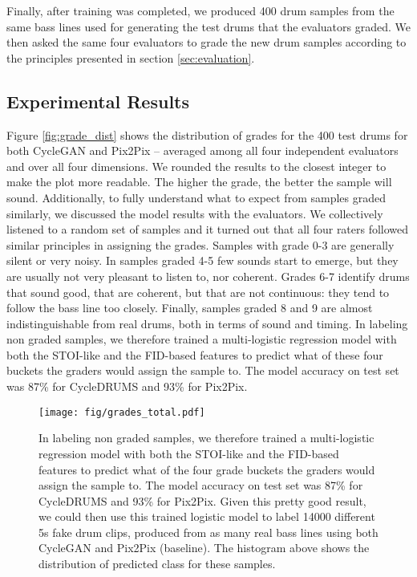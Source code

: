 \documentclass[journal]{IEEEtran}
\begin{document}
Finally, after training was completed, we produced 400 drum samples from the same bass lines used for generating the test drums that the evaluators graded. We then asked the same four evaluators to grade the new drum samples according to the principles presented in section \ref{sec:evaluation}. 

\subsection{Experimental Results}

Figure \ref{fig:grade_dist} shows the distribution of grades for the 400 test drums for both CycleGAN and Pix2Pix -- averaged among all four independent evaluators and over all four dimensions. We rounded the results to the closest integer to make the plot more readable. The higher the grade, the better the sample will sound. Additionally, to fully understand what to expect from samples graded similarly, we discussed the model results with the evaluators. We collectively listened to a random set of samples and it turned out that all four raters followed similar principles in assigning the grades. Samples with grade 0-3 are generally silent or very noisy. In samples graded 4-5 few sounds start to emerge, but they are usually not very pleasant to listen to, nor coherent. Grades 6-7 identify drums that sound good, that are coherent, but that are not continuous: they tend to follow the bass line too closely. Finally, samples graded 8 and 9 are almost indistinguishable from real drums, both in terms of sound and timing. In labeling non graded samples, we therefore trained a multi-logistic regression model with both the STOI-like and the FID-based features to predict what of these four buckets the graders would assign the sample to. The model accuracy on test set was 87\% for CycleDRUMS and 93\% for Pix2Pix.

\begin{figure*}[!ht]
\begin{center}
\texttt{[image: fig/grades\_total.pdf]}
\end{center}
\caption{\centering In labeling non graded samples, we therefore trained a multi-logistic regression model with both the STOI-like and the FID-based features to predict what of the four grade buckets the graders would assign the sample to. The model accuracy on test set was 87\% for CycleDRUMS and 93\% for Pix2Pix. Given this pretty good result, we could then use this trained logistic model to label 14000 different 5s fake drum clips, produced from as many real bass lines using both CycleGAN and Pix2Pix (baseline). The histogram above shows the distribution of predicted class for these samples.} 
\label{fig:classes}
\end{figure*}
\end{document}
